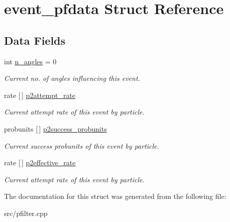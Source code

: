 \hypertarget{structevent__pfdata}{}\section{event\+\_\+pfdata Struct Reference}
\label{structevent__pfdata}
\subsection*{Data Fields}
\begin{DoxyCompactItemize}
\item 
\mbox{\label{structevent__pfdata_afe70ccc997e1a872d0ef94186fc7d90a}} 
int \hyperlink{structevent__pfdata_afe70ccc997e1a872d0ef94186fc7d90a}{n\+\_\+angles} = 0
\begin{DoxyCompactList}\small\item\em Current no. of angles influencing this event. \end{DoxyCompactList}\item 
\mbox{\label{structevent__pfdata_aa8dd6e731edb96db48efae65a89a88a8}} 
rate \mbox{[}$\,$\mbox{]} \hyperlink{structevent__pfdata_aa8dd6e731edb96db48efae65a89a88a8}{p2attempt\+\_\+rate}
\begin{DoxyCompactList}\small\item\em Current attempt rate of this event by particle. \end{DoxyCompactList}\item 
\mbox{\label{structevent__pfdata_a60cba1498bcf822925cd4d6db9058671}} 
probunits \mbox{[}$\,$\mbox{]} \hyperlink{structevent__pfdata_a60cba1498bcf822925cd4d6db9058671}{p2success\+\_\+probunits}
\begin{DoxyCompactList}\small\item\em Current success probunits of this event by particle. \end{DoxyCompactList}\item 
\mbox{\label{structevent__pfdata_a71164d87008b4b698498557f18b8ab34}} 
rate \mbox{[}$\,$\mbox{]} \hyperlink{structevent__pfdata_a71164d87008b4b698498557f18b8ab34}{p2effective\+\_\+rate}
\begin{DoxyCompactList}\small\item\em Current attempt rate of this event by particle. \end{DoxyCompactList}\end{DoxyCompactItemize}


The documentation for this struct was generated from the following file\+:\begin{DoxyCompactItemize}
\item 
src/pfilter.\+cpp\end{DoxyCompactItemize}
